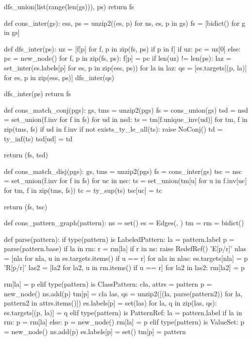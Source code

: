 \begin{dispPy}
    dfs_union(list(range(len(gs))), ps)
    return fs

def cons_inter(gs):
    ess, ps = unzip2((es, p) for ns, es, p in gs)
    fs = [bidict() for g in gs]

    def dfs_inter(ps):
        uz = [f[p] for f, p in zip(fs, ps) if p in f]
        if uz:
            pc = uz[0]
        else:
            pc = new_node()
        for f, p in zip(fs, ps):
            f[p] = pc
        if len(uz) != len(ps):
            laz = set_inter(es.labels[p] for es, p in zip(ess, ps))
            for la in laz:
                qs = [es.targets[(p, la)] for es, p in zip(ess, ps)]
                dfs_inter(qs)

    dfs_inter(ps)
    return fs

def cons_match_conj(pgs):
    gs, tms = unzip2(pgs)
    fs = cons_union(gs)
    tsd = {}
    nsd = set_union(f.inv for f in fs)
    for ud in nsd:
        ts = {tm[f.unique_inv(ud)] for tm, f in zip(tms, fs) if ud in f.inv}
        if not exists_ty_le_all(ts):
            raise NoConj()
        td = ty_inf(ts)
        tsd[ud] = td

    return (fs, tsd)

def cons_match_disj(pgs):
    gs, tms = unzip2(pgs)
    fs = cons_inter(gs)
    tsc = {}
    nsc = set_union(f.inv for f in fs)
    for uc in nsc:
        ts = set_union({tm[u] for u in f.inv[uc]} for tm, f in zip(tms, fs))
        tc = ty_sup(ts)
        tsc[uc] = tc

    return (fs, tsc)

def cons_pattern_graph(pattern):
    ns = set()
    es = Edges({}, {})
    tm = {}
    rm = bidict()

    def parse(pattern):
        if type(pattern) is LabeledPattern:
            la = pattern.label
            p = parse(pattern.base)
            if la in rm:
                r = rm[la]
                if r in ns:
                    raise RedefRef()
                'E[p/r]'
                nlas = [nla for nla, u in es.targets.items() if u == r]
                for nla in nlas:
                    es.targets[nla] = p
                'R[p/r]'
                las2 = [la2 for la2, u in rm.items() if u == r]
                for la2 in las2:
                    rm[la2] = p

            rm[la] = p
        elif type(pattern) is ClassPattern:
            cla, attrs = pattern
            p = new_node()
            ns.add(p)
            tm[p] = cla
            las, qs = unzip2([(la, parse(pattern2))
                              for la, pattern2 in attrs.items()])
            es.labels[p] = set(las)
            for la, q in zip(las, qs):
                es.targets[(p, la)] = q
        elif type(pattern) is PatternRef:
            la = pattern.label
            if la in rm:
                p = rm[la]
            else:
                p = new_node()
                rm[la] = p
        elif type(pattern) is ValueSet:
            p = new_node()
            ns.add(p)
            es.labels[p] = set()
            tm[p] = pattern


\end{dispPy}
